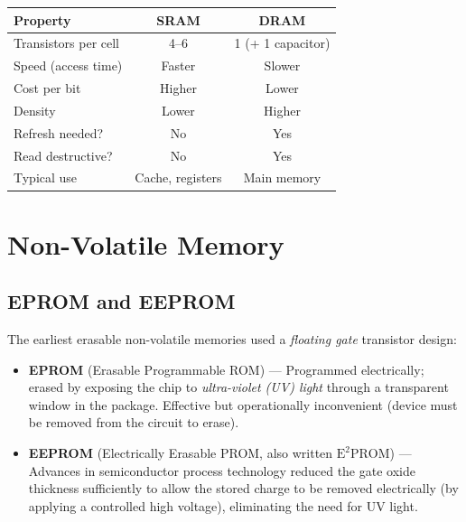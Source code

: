 \documentclass[11pt, a4paper, notitlepage]{report}
\theoremstyle{definition}
\theoremstyle{remark}
\theoremstyle{definition}
\begin{document}
\begin{keyresult}[title={Key Result: SRAM vs.\ DRAM Comparison}]
  \begin{center}
  \renewcommand{\arraystretch}{1.3}
  \begin{tabular}{lcc}
    \toprule
    \textbf{Property} & \textbf{SRAM} & \textbf{DRAM} \\
    \midrule
    Transistors per cell & 4–6 & 1 (+ 1 capacitor) \\
    Speed (access time)  & Faster & Slower \\
    Cost per bit         & Higher & Lower \\
    Density              & Lower & Higher \\
    Refresh needed?      & No & Yes \\
    Read destructive?    & No & Yes \\
    Typical use          & Cache, registers & Main memory \\
    \bottomrule
  \end{tabular}
  \end{center}
\end{keyresult}

\section{Non-Volatile Memory}
\label{ch:nvm}

\subsection{EPROM and EEPROM}
\label{sec:eprom-eeprom}

The earliest erasable non-volatile memories used a \emph{floating gate} transistor design:

\begin{itemize}
  \item \textbf{EPROM} (Erasable Programmable ROM) — Programmed electrically; erased by exposing the chip to \emph{ultra-violet (UV) light} through a transparent window in the package. Effective but operationally inconvenient (device must be removed from the circuit to erase).
  \item \textbf{EEPROM} (Electrically Erasable PROM, also written $\text{E}^2\text{PROM}$) — Advances in semiconductor process technology reduced the gate oxide thickness sufficiently to allow the stored charge to be removed electrically (by applying a controlled high voltage), eliminating the need for UV light.
\end{itemize}
\end{document}
